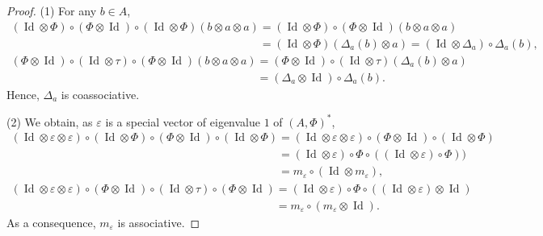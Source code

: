 \documentclass[pdftex]{sigma}
\numberwithin{equation}{section}
\begin{document}
\begin{proof}
(1) For any $b\in A$,
\begin{gather*}
(\operatorname{Id} \otimes \Phi)\circ (\Phi\otimes \operatorname{Id})\circ (\operatorname{Id} \otimes \Phi)(b\otimes a\otimes a)=(\operatorname{Id} \otimes \Phi)\circ (\Phi\otimes \operatorname{Id})(b\otimes a\otimes a)\\
\phantom{(\operatorname{Id} \otimes \Phi)\circ (\Phi\otimes \operatorname{Id})\circ (\operatorname{Id} \otimes \Phi)(b\otimes a\otimes a)}{}=(\operatorname{Id} \otimes \Phi)(\Delta_a(b)\otimes a)=(\operatorname{Id} \otimes \Delta_a)\circ \Delta_a(b),\\
(\Phi\otimes \operatorname{Id})\circ (\operatorname{Id} \otimes \tau)\circ (\Phi\otimes \operatorname{Id})(b\otimes a\otimes a)=(\Phi\otimes \operatorname{Id})\circ (\operatorname{Id} \otimes \tau)(\Delta_a(b)\otimes a)\\
\phantom{(\Phi\otimes \operatorname{Id})\circ (\operatorname{Id} \otimes \tau)\circ (\Phi\otimes \operatorname{Id})(b\otimes a\otimes a)}{}=(\Delta_a\otimes \operatorname{Id})\circ \Delta_a(b).
\end{gather*}
Hence, $\Delta_a$ is coassociative.

(2) We obtain, as $\varepsilon$ is a special vector of eigenvalue $1$ of $(A,\Phi)^*$,
\begin{gather*}
(\operatorname{Id} \otimes \varepsilon\otimes \varepsilon)\circ (\operatorname{Id} \otimes \Phi)\circ (\Phi\otimes \operatorname{Id})\circ (\operatorname{Id} \otimes \Phi)=(\operatorname{Id} \otimes \varepsilon\otimes \varepsilon)\circ (\Phi\otimes \operatorname{Id})\circ (\operatorname{Id} \otimes \Phi)\\
\phantom{(\operatorname{Id} \otimes \varepsilon\otimes \varepsilon)\circ (\operatorname{Id} \otimes \Phi)\circ (\Phi\otimes \operatorname{Id})\circ (\operatorname{Id} \otimes \Phi)}{}=(\operatorname{Id} \otimes \varepsilon)\circ \Phi\circ ((\operatorname{Id} \otimes \varepsilon)\circ \Phi))\\
\phantom{(\operatorname{Id} \otimes \varepsilon\otimes \varepsilon)\circ (\operatorname{Id} \otimes \Phi)\circ (\Phi\otimes \operatorname{Id})\circ (\operatorname{Id} \otimes \Phi)}{}=m_\varepsilon\circ(\operatorname{Id} \otimes m_\varepsilon),\\
(\operatorname{Id} \otimes \varepsilon\otimes \varepsilon)\circ (\Phi\otimes \operatorname{Id})\circ (\operatorname{Id} \otimes \tau)\circ (\Phi\otimes \operatorname{Id})=(\operatorname{Id} \otimes \varepsilon )\circ \Phi\circ ((\operatorname{Id} \otimes \varepsilon )\otimes \operatorname{Id})\\
\phantom{(\operatorname{Id} \otimes \varepsilon\otimes \varepsilon)\circ (\Phi\otimes \operatorname{Id})\circ (\operatorname{Id} \otimes \tau)\circ (\Phi\otimes \operatorname{Id})}{}=m_\varepsilon\circ(m_\varepsilon\otimes \operatorname{Id}).
\end{gather*}
As a consequence, $m_\varepsilon$ is associative.


\end{proof}
\end{document}

